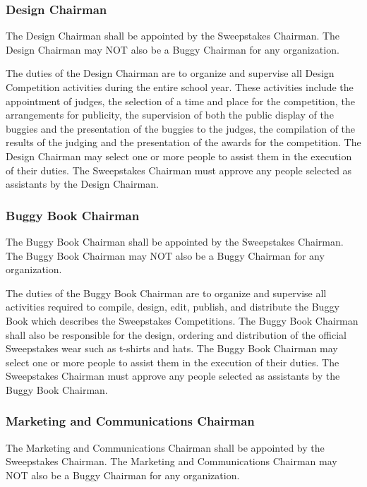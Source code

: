 \subsubsection{Design Chairman}

	The Design Chairman shall be appointed by the Sweepstakes Chairman. The Design Chairman may NOT also be a Buggy Chairman for any organization.

	The duties of the Design Chairman are to organize and supervise all Design Competition activities during the entire school year. These activities include the appointment of judges, the selection of a time and place for the competition, the arrangements for publicity, the supervision of both the public display of the buggies and the presentation of the buggies to the judges, the compilation of the results of the judging and the presentation of the awards for the competition. The Design Chairman may select one or more people to assist them in the execution of their duties. The Sweepstakes Chairman must approve any people selected as assistants by the Design Chairman.

\subsubsection{Buggy Book Chairman}

	The Buggy Book Chairman shall be appointed by the Sweepstakes Chairman. The Buggy Book Chairman may NOT also be a Buggy Chairman for any organization.

	The duties of the Buggy Book Chairman are to organize and supervise all activities required to compile, design, edit, publish, and distribute the Buggy Book which describes the Sweepstakes Competitions. The Buggy Book Chairman shall also be responsible for the design, ordering and distribution of the official Sweepstakes wear such as t-shirts and hats. The Buggy Book Chairman may select one or more people to assist them in the execution of their duties. The Sweepstakes Chairman must approve any people selected as assistants by the Buggy Book Chairman.

\subsubsection{Marketing and Communications Chairman}

	The Marketing and Communications Chairman shall be appointed by the Sweepstakes Chairman. The Marketing and Communications Chairman may NOT also be a Buggy Chairman for any organization. 

